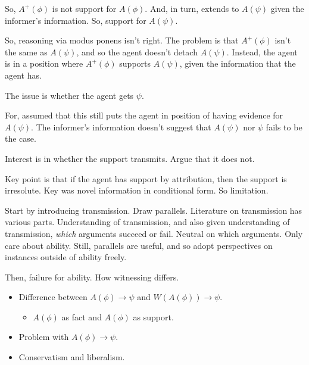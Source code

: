 \documentclass[10pt]{article}
\begin{document}
\begin{note}
  So, \(A^{+}(\phi)\) is not support for \(A(\phi)\).
  And, in turn, extends to \(A(\psi)\) given the informer's information.
  So, support for \(A(\psi)\).

  So, reasoning via modus ponens isn't right.
  The problem is that \(A^{+}(\phi)\) isn't the same as \(A(\psi)\), and so the agent doesn't detach \(A(\psi)\).
  Instead, the agent is in a position where \(A^{+}(\phi)\) supports \(A(\psi)\), given the information that the agent has.

  The issue is whether the agent gets \(\psi\).

  For, assumed that this still puts the agent in position of having evidence for \(A(\psi)\).
  The informer's information doesn't suggest that \(A(\psi)\) nor \(\psi\) fails to be the case.

  Interest is in whether the support transmits.
  Argue that it does not.
\end{note}

\begin{note}[Summary]
  Key point is that if the agent has support by attribution, then the support is irresolute.
  Key was novel information in conditional form.
  So limitation.
\end{note}

\begin{note}
  Start by introducing transmission.
  Draw parallels.
  Literature on transmission has various parts.
  Understanding of transmission, and also given understanding of transmission, \emph{which} arguments succeed or fail.
  Neutral on which arguments.
  Only care about ability.
  Still, parallels are useful, and so adopt perspectives on instances outside of ability freely.

  Then, failure for ability.
  How witnessing differs.
\end{note}

\begin{note}[Sketch]
  \begin{itemize}
  \item Difference between \(A(\phi) \rightarrow \psi\) and \(W(A(\phi)) \rightarrow \psi\).
    \begin{itemize}
    \item \(A(\phi)\) as fact and \(A(\phi)\) as support.
    \end{itemize}
  \item Problem with \(A(\phi) \rightarrow \psi\).
  \item Conservatism and liberalism.
  \end{itemize}
\end{note}
\end{document}
